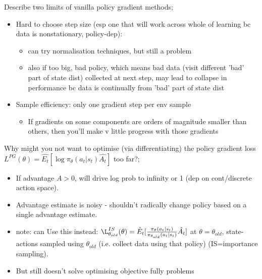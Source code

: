 \documentclass{article}
\begin{document}


Describe two limits of vanilla policy gradient methods; \begin{itemize} \item Hard to choose step size (esp one that will work across whole of learning bc data is nonstationary, policy-dep):  \begin{itemize} \item can try normalisation techniques, but still a problem \item also if too big, bad policy, which means bad data (visit different 'bad' part of state dist) collected at next step, may lead to collapse in performance bc data is continually from 'bad' part of state dist \end{itemize} \item Sample efficiency: only one gradient step per env sample \begin{itemize} \item If gradients on some components are orders of magnitude smaller than others, then you'll make v little progress with those gradients \end{itemize} \end{itemize}


Why might you not want to optimise (via differentiating) the policy gradient loss $L^{PG}(\theta) = \hat{E_t}[\log\pi_\theta(a_t|s_t)\hat{A_t}]$ too far?; \begin{itemize} \item If advantage $A>0$, will drive log prob to infinity or 1 (dep on cont/discrete action space). \item Advantage estimate is noisy - shouldn't radically change policy based on a single advantage estimate. \item note: can Use this instead: $\L^{IS}_{\theta_{old}}(\theta) = \hat{E}_t[\frac{\pi_\theta(a_t|s_t)}{\pi_{\theta_{old}}(a_t|s_t)}\hat{A_t}]$ at $\theta=\theta_{old}$, state-actions sampled using $\theta_{old}$ (i.e. collect data using that policy) (IS=importance sampling). \item But still doesn't solve optimising objective fully problems \end{itemize}
\end{document}
